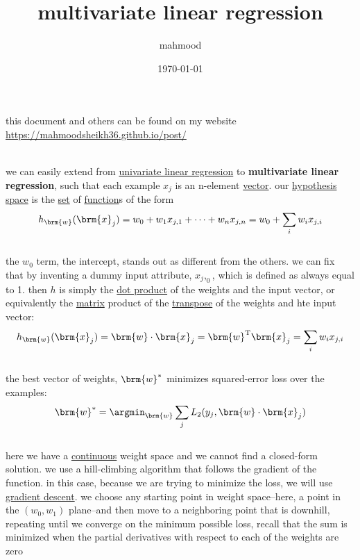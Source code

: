 \documentclass[a4paper,12pt]{article}
\author{mahmood}
\date{\today}
\title{multivariate linear regression}
\begin{document}
\maketitle
\begin{note}
this document and others can be found on my website\\
\url{https://mahmoodsheikh36.github.io/post/}
\end{note}
\cite{aima2010}\\
we can easily extend from \href{20230313223324-univariate_linear_regression.org}{univariate linear regression} to \textbf{multivariate linear regression}, such that each example \(x_j\) is an n-element \href{linear_algebra2.org}{vector}. our \href{20230225234105-hypothesis_space.org}{hypothesis space} is the \href{discrete_maths2.org}{set} of \href{discrete_maths2.org}{function}s of the form\\
\[
h_{\brm{w}}(\brm{x}_j) = w_0+w_1x_{j,1} + \dots + w_nx_{j,n} = w_0+\sum_{i} w_ix_{j,i}
\]\\
the \(w_0\) term, the intercept, stands out as different from the others. we can fix that by inventing a dummy input attribute, \(x_j,_0\), which is defined as always equal to 1. then \(h\) is simply the \href{linear_algebra2.org}{dot product} of the weights and the input vector, or equivalently the \href{linear_algebra2.org}{matrix} product of the \href{linear_algebra2.org}{transpose} of the weights and hte input vector:\\
\[
h_{\brm{w}}(\brm{x}_j) = \brm{w} \cdot \brm{x}_j = \brm{w}^\mathrm{T} \brm{x}_j = \sum_{i} w_ix_{j,i}
\]\\
the best vector of weights, \(\brm{w}^*\) minimizes squared-error loss over the examples:\\
\[
\brm{w}^* = \argmin_{\brm{w}} \sum_{j} L_2(y_j, \brm{w} \cdot \brm{x}_j)
\]\\
here we have a \href{20230422235527-continuous.org}{continuous} weight space and we cannot find a closed-form solution. we use a hill-climbing algorithm that follows the gradient of the function. in this case, because we are trying to minimize the loss, we will use \href{20230422235640-gradient_descent.org}{gradient descent}. we choose any starting point in weight space--here, a point in the \((w_0,w_1)\) plane--and then move to a neighboring point that is downhill, repeating until we converge on the minimum possible loss, recall that the sum is minimized when the partial derivatives with respect to each of the weights are zero\\
\\
\end{document}
